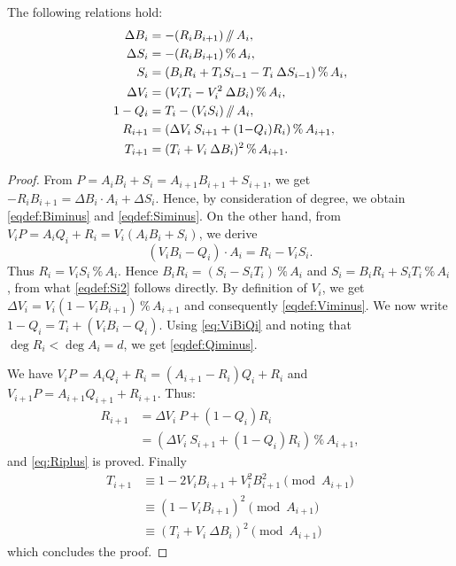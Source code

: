 \documentclass{sig-alternate-2013}
\renewcommand{\mod}{\,\%\,}
\renewcommand{\div}{\,/\hspace{-0.3em}/\,}
\begin{document}
\begin{lem} \label{lem:formulae}
The following relations hold:
\begin{align}
\Delta B_i &= -(R_i B_{i+1}) \div A_i, \label{eqdef:Biminus} \\
\Delta S_i &= -(R_i B_{i+1}) \mod A_i,  \label{eqdef:Siminus} \\
S_{i} &= (B_i R_i + T_i S_{i-1} - T_i \: \Delta S_{i-1}) \mod A_{i}, \label{eqdef:Si2}  \\
\Delta V_i &= (V_i T_i - V_i^2 \: \Delta B_i) \mod A_{i}, \label{eqdef:Viminus}\\
1-Q_i &= T_i - (V_i S_i) \div A_i, \label{eqdef:Qiminus}\\
R_{i+1} &= (\Delta V_i \: S_{i+1}+(1{-}Q_i)R_i) \mod A_{i+1}, \label{eq:Riplus}\\
T_{i+1} &= (T_i + V_i \: \Delta B_i)^2 \mod{A_{i+1}}. \label{eq:ViBiplus}
\end{align}
\end{lem}

\begin{proof}
From $P= A_i B_i + S_i= A_{i+1} B_{i+1} + S_{i+1}$, we get
$- R_i B_{i+1}= \Delta B_i \cdot A_i + \Delta S_i$.
Hence, by consideration of degree, we obtain \eqref{eqdef:Biminus} 
and \eqref{eqdef:Siminus}.
On the other hand, from $V_i P = A_i Q_i + R_i=V_i (A_i B_i + S_i)$, we 
derive
\begin{equation}
\label{eq:ViBiQi} 
(V_i B_i -Q_i) \cdot A_i=R_i-V_i S_i. 
\end{equation} 
Thus $R_i=V_i S_i \mod A_i$.
Hence $B_i R_i = (S_i - S_i T_i) \mod A_i$ and $S_i = B_i R_i + S_i T_i 
\mod A_i$, from what \eqref{eqdef:Si2} follows directly.
By definition of $V_i$, we get $\Delta V_i = V_i (1-V_i B_{i+1}) \mod A_{i+1}$ and consequently \eqref{eqdef:Viminus}.
We now write $1-Q_i= T_i + (V_i B_i - Q_i)$. Using \eqref{eq:ViBiQi} and
noting that $\deg R_i < \deg A_i = d$, we 
get \eqref{eqdef:Qiminus}.

We have $V_i P=A_i Q_i+R_i=(A_{i+1}-R_i)Q_i+R_i$ and $V_{i+1} P=A_{i+1} 
Q_{i+1}+R_{i+1}$. Thus:
\begin{align*}
R_{i+1} &= \Delta V_i \: P + (1-Q_i)R_i \\
 &= (\Delta V_i \: S_{i+1} + (1-Q_i)R_i) \mod A_{i+1},
\end{align*} 
and \eqref{eq:Riplus} is proved. Finally
\begin{align*}
T_{i+1} &\equiv 1-2V_i B_{i+1}+V_i^2 B_{i+1}^2 \pmod {A_{i+1}} \\
&\equiv (1-V_i B_{i+1})^2 \pmod {A_{i+1}} \\
&\equiv (T_i + V_i \: \Delta B_i)^2 \pmod {A_{i+1}}
\end{align*}
which concludes the proof.
\end{proof}
\end{document}
